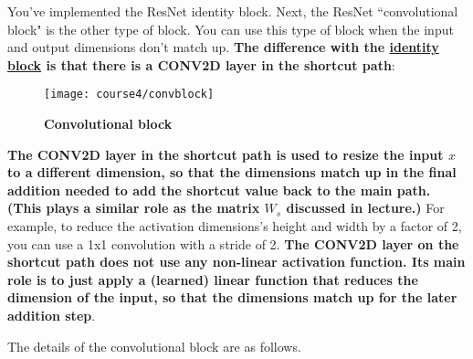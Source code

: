 
You've implemented the ResNet identity block. Next, the ResNet ``convolutional block" is the other type of block. You can use this type of block when {\color{red}the input and output dimensions don't match up. \textbf{The difference with the \hyperref[identity_block]{identity block} is that there is a CONV2D layer in the shortcut path}}:
\begin{figure}[h]
\begin{center}
\texttt{[image: course4/convblock]}
\caption{{\textbf{Convolutional block}}}
\end{center}
\end{figure}

{\color{red}\textbf{The CONV2D layer in the shortcut path is used to resize the input $x$ to a different dimension, so that the dimensions match up in the final addition needed to add the shortcut value back to the main path. (This plays a similar role as the matrix $W_s$ discussed in lecture.)}} For example, to reduce the activation dimensions's height and width by a factor of 2, you can use a 1x1 convolution with a stride of 2. {\textbf{The CONV2D layer on the shortcut path does not use any non-linear activation function. Its main role is to just apply a (learned) linear function that reduces the dimension of the input, so that the dimensions match up for the later addition step}}. 

The details of the convolutional block are as follows. 


